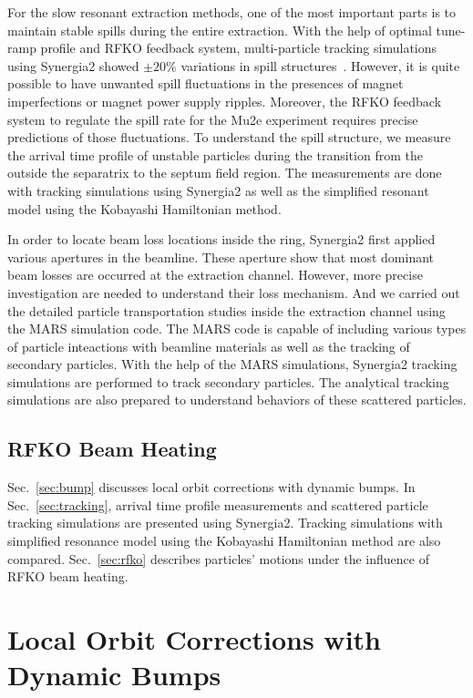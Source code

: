 \documentclass[aps,prstab,onecolumn,preprint,endfloats,11pt]{revtex4-1}
\begin{document}
For the slow resonant extraction methods, one of the most important parts is to maintain stable spills during the entire extraction. With the help of optimal tune-ramp profile and RFKO feedback system, multi-particle tracking simulations using Synergia2 showed \mbox{$\pm 20\%$} variations in spill structures~\cite{mu2e}. However, it is quite possible to have unwanted spill fluctuations in the presences of magnet imperfections or magnet power supply ripples. Moreover, the RFKO feedback system to regulate the spill rate for the Mu2e experiment requires precise predictions of those fluctuations. To understand the spill structure, we measure the arrival time profile of unstable particles during the transition from the outside the separatrix to the septum field region. The measurements are done with tracking simulations using Synergia2 as well as the simplified resonant model using the Kobayashi Hamiltonian method.

In order to locate beam loss locations inside the ring, Synergia2 first applied various apertures in the beamline. These aperture show that most dominant beam losses are occurred at the extraction channel. However, more precise investigation are needed to understand their loss mechanism. And we carried out the detailed particle transportation studies inside the extraction channel using the MARS simulation code. The MARS code is capable of including various types of particle inteactions with beamline materials as well as the tracking of secondary particles. With the help of the MARS simulations, Synergia2 tracking simulations are performed to track secondary particles. The analytical tracking simulations are also prepared to understand behaviors of these scattered particles. 

\subsection{RFKO Beam Heating}


Sec.~\ref{sec:bump} discusses local orbit corrections with dynamic bumps. In Sec.~\ref{sec:tracking}, arrival time profile measurements and scattered particle tracking simulations are presented using Synergia2. Tracking simulations with simplified resonance model using the Kobayashi Hamiltonian method are also compared. Sec.~\ref{sec:rfko} describes particles' motions under the influence of RFKO beam heating.


\section{\label{sec:bump}Local Orbit Corrections with Dynamic Bumps}
\end{document}
